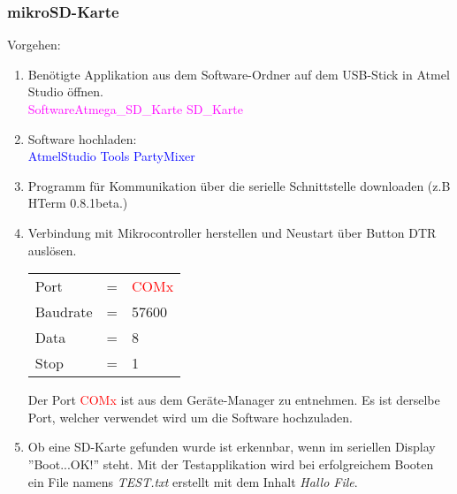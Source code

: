 \subsubsection{mikroSD-Karte}
\label{subsubsec:Inbetriebnahme_mikroSD_Karte}

Vorgehen:
\begin{enumerate}
\item Benötigte Applikation aus dem Software-Ordner auf dem USB-Stick in Atmel Studio öffnen.\\
\textcolor{magenta}{Software\textrightarrow Atmega\_SD\_Karte \textrightarrow SD\_Karte}\\

\item Software hochladen:\\
\textcolor{blue}{AtmelStudio \textrightarrow Tools \textrightarrow PartyMixer}\\

\item Programm für Kommunikation über die serielle Schnittstelle downloaden (z.B HTerm 0.8.1beta.)\cite{hammer_hterm_nodate}\\
\item Verbindung mit Mikrocontroller herstellen und Neustart über Button DTR auslösen.\\

\begin{table}[h!]
\center
\begin{tabular}{lcl}
Port & = & \textcolor{red}{COMx} \\
Baudrate & = & 57600 \\
Data & = & 8 \\
Stop & = & 1 \\
\end{tabular}
\end{table}

Der Port \textcolor{red}{COMx} ist aus dem Geräte-Manager zu entnehmen. Es ist derselbe Port, welcher verwendet wird um die Software hochzuladen.\\

\item Ob eine SD-Karte gefunden wurde ist erkennbar, wenn im seriellen Display ''Boot...OK!'' steht. Mit der Testapplikation wird bei erfolgreichem Booten ein File namens \textit{TEST.txt} erstellt mit dem Inhalt \textit{Hallo File}.

\end{enumerate}
